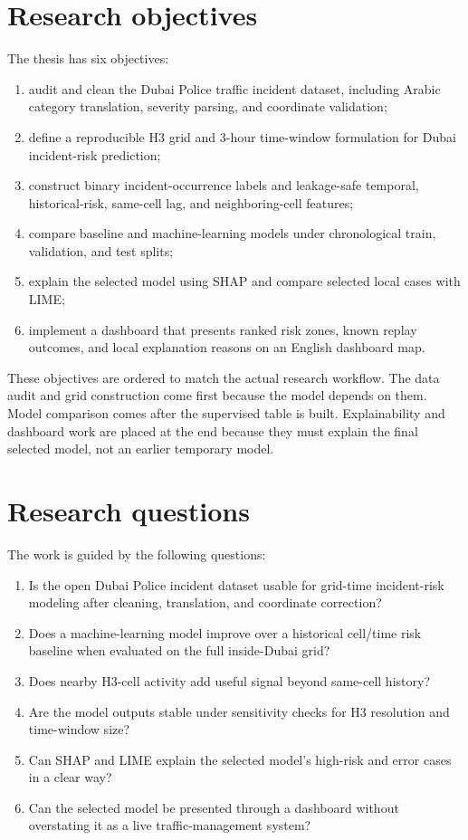 \section{Research objectives}

The thesis has six objectives:

\begin{enumerate}
    \item audit and clean the Dubai Police traffic incident dataset, including Arabic category translation, severity parsing, and coordinate validation;
    \item define a reproducible H3 grid and 3-hour time-window formulation for Dubai incident-risk prediction;
    \item construct binary incident-occurrence labels and leakage-safe temporal, historical-risk, same-cell lag, and neighboring-cell features;
    \item compare baseline and machine-learning models under chronological train, validation, and test splits;
    \item explain the selected model using SHAP and compare selected local cases with LIME;
    \item implement a dashboard that presents ranked risk zones, known replay outcomes, and local explanation reasons on an English dashboard map.
\end{enumerate}

These objectives are ordered to match the actual research workflow. The data audit and grid construction come first because the model depends on them. Model comparison comes after the supervised table is built. Explainability and dashboard work are placed at the end because they must explain the final selected model, not an earlier temporary model.

\section{Research questions}

The work is guided by the following questions:

\begin{enumerate}
    \item Is the open Dubai Police incident dataset usable for grid-time incident-risk modeling after cleaning, translation, and coordinate correction?
    \item Does a machine-learning model improve over a historical cell/time risk baseline when evaluated on the full inside-Dubai grid?
    \item Does nearby H3-cell activity add useful signal beyond same-cell history?
    \item Are the model outputs stable under sensitivity checks for H3 resolution and time-window size?
    \item Can SHAP and LIME explain the selected model's high-risk and error cases in a clear way?
    \item Can the selected model be presented through a dashboard without overstating it as a live traffic-management system?
\end{enumerate}

